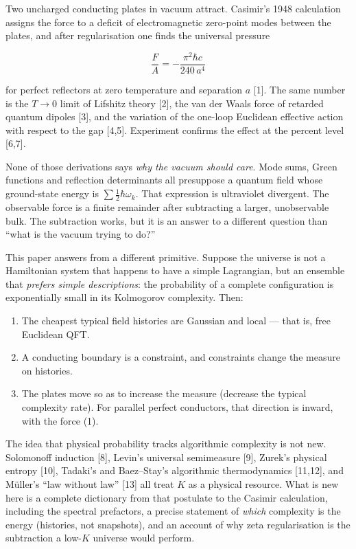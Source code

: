 \documentclass[11pt,letterpaper]{article}
\begin{document}
Two uncharged conducting plates in vacuum attract. Casimir’s 1948 calculation assigns the force to a deficit of electromagnetic zero-point modes between the plates, and after regularisation one finds the universal pressure


\[
\frac{F}{A}=-\frac{\pi^{2}\hbar c}{240\,a^{4}}
\tag{1}
\]


for perfect reflectors at zero temperature and separation \(a\) [1]. The same number is the \(T\to 0\) limit of Lifshitz theory [2], the van der Waals force of retarded quantum dipoles [3], and the variation of the one-loop Euclidean effective action with respect to the gap [4,5]. Experiment confirms the effect at the percent level [6,7].


None of those derivations says \emph{why the vacuum should care}. Mode sums, Green functions and reflection determinants all presuppose a quantum field whose ground-state energy is \(\sum\tfrac12\hbar\omega_k\). That expression is ultraviolet divergent. The observable force is a finite remainder after subtracting a larger, unobservable bulk. The subtraction works, but it is an answer to a different question than “what is the vacuum trying to do?”


This paper answers from a different primitive. Suppose the universe is not a Hamiltonian system that happens to have a simple Lagrangian, but an ensemble that \emph{prefers simple descriptions}: the probability of a complete configuration is exponentially small in its Kolmogorov complexity. Then:


\begin{enumerate}
\item The cheapest typical field histories are Gaussian and local — that is, free Euclidean QFT.
\item A conducting boundary is a constraint, and constraints change the measure on histories.
\item The plates move so as to increase the measure (decrease the typical complexity rate). For parallel perfect conductors, that direction is inward, with the force (1).
\end{enumerate}


The idea that physical probability tracks algorithmic complexity is not new. Solomonoff induction [8], Levin’s universal semimeasure [9], Zurek’s physical entropy [10], Tadaki’s and Baez–Stay’s algorithmic thermodynamics [11,12], and Müller’s “law without law” [13] all treat \(K\) as a physical resource. What is new here is a complete dictionary from that postulate to the Casimir calculation, including the spectral prefactors, a precise statement of \emph{which} complexity is the energy (histories, not snapshots), and an account of why zeta regularisation is the subtraction a low-\(K\) universe would perform.
\end{document}
